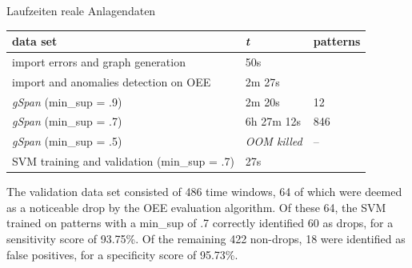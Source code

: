 \documentclass{beamer}
\begin{document}
\begin{frame}{Laufzeiten reale Anlagendaten}
\begin{table}
    \centering
    \label{table:runtimes_real} 
    \begin{tabular}{l|l|l}
        data set                                      & \textit{t}          & patterns \\ \hline
        import errors and graph generation            & 50s                 &          \\
        import and anomalies detection on OEE         & 2m 27s              &          \\ \hline
        \textit{gSpan} (min\_sup = .9)                & 2m 20s              & 12       \\
        \textit{gSpan} (min\_sup = .7)                & 6h 27m 12s          & 846      \\
        \textit{gSpan} (min\_sup = .5)                & \textit{OOM killed} & --       \\ \hline
        SVM training and validation   (min\_sup = .7) & 27s                 &
    \end{tabular}
\end{table}
The validation data set consisted of 486 time windows, 64 of which were deemed as a noticeable drop by the OEE evaluation algorithm. Of these 64, the SVM trained on patterns with a min\_sup of .7 correctly identified 60 as drops, for a sensitivity score of 93.75\%. Of the remaining 422 non-drops, 18 were identified as false positives, for a specificity score of 95.73\%.
\end{frame}
\end{document}
